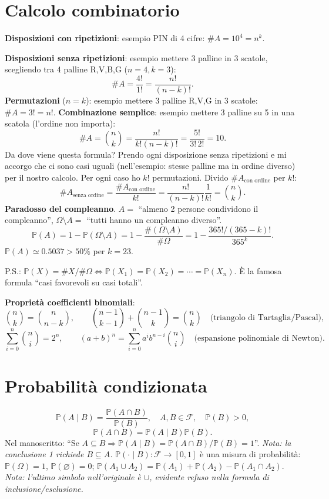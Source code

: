 \documentclass[11pt,a4paper]{article}
\newcommand{\pagina}[1]{\clearpage}
\begin{document}
\section*{Calcolo combinatorio}
\textbf{Disposizioni con ripetizioni}: esempio PIN di 4 cifre: $\#A=10^4=\boxed{n^k}$.

\textbf{Disposizioni senza ripetizioni}: esempio mettere 3 palline in 3 scatole, scegliendo tra 4 palline R,V,B,G ($n=4,k=3$):
\[\#A=\frac{4!}{1!}=\boxed{\frac{n!}{(n-k)!}}.\]
\textbf{Permutazioni} ($n=k$): esempio mettere 3 palline R,V,G in 3 scatole: $\#A=3!=\boxed{n!}$.
\pagina{14}\textbf{Combinazione semplice}: esempio mettere 3 palline su 5 in una scatola (l'ordine non importa):
\[\#A=\boxed{\binom nk}=\frac{n!}{k!(n-k)!}=\frac{5!}{3!\,2!}=10.\]
Da dove viene questa formula? Prendo ogni disposizione senza ripetizioni e mi accorgo che ci sono casi uguali (nell'esempio: stesse palline ma in ordine diverso) per il nostro calcolo. Per ogni caso ho $k!$ permutazioni. Divido $\#A_{\text{con ordine}}$ per $k!$:
\[\#A_{\text{senza ordine}}=\frac{\#A_{\text{con ordine}}}{k!}=\frac{n!}{(n-k)!}\frac1{k!}=\binom nk.\]
\textbf{Paradosso del compleanno}. $A=$ ``almeno 2 persone condividono il compleanno'', $\Omega\setminus A=$ ``tutti hanno un compleanno diverso''.
\[\mathbb P(A)=1-\mathbb P(\Omega\setminus A)=1-\frac{\#(\Omega\setminus A)}{\#\Omega}=1-\frac{365!/(365-k)!}{365^k}.\]
$\mathbb P(A)\simeq0.5037>50\%$ per $k=23$.

P.S.: $\mathbb P(X)=\#X/\#\Omega\Longleftrightarrow\mathbb P(X_1)=\mathbb P(X_2)=\cdots=\mathbb P(X_n)$. È la famosa formula ``casi favorevoli su casi totali''.

\textbf{Proprietà coefficienti binomiali}:
\[\binom nk=\binom n{n-k},\qquad\binom{n-1}{k-1}+\binom{n-1}k=\binom nk\quad\text{(triangolo di Tartaglia/Pascal)},\]
\[\sum_{i=0}^n\binom ni=2^n,\qquad(a+b)^n=\sum_{i=0}^n a^i b^{n-i}\binom ni\quad\text{(espansione polinomiale di Newton)}.\]
\pagina{15}\section*{Probabilità condizionata}
\[\boxed{\mathbb P(A\mid B)=\frac{\mathbb P(A\cap B)}{\mathbb P(B)}},\quad A,B\in\mathcal F,\quad\mathbb P(B)>0,\]
\[\mathbb P(A\cap B)=\mathbb P(A\mid B)\mathbb P(B).\]
Nel manoscritto: ``Se $A\subseteq B\Rightarrow\mathbb P(A\mid B)=\mathbb P(A\cap B)/\mathbb P(B)=1$''. \emph{Nota: la conclusione 1 richiede $B\subseteq A$.}
$\mathbb P(\cdot\mid B):\mathcal F\to[0,1]$ è una misura di probabilità: $\mathbb P(\Omega)=1$, $\mathbb P(\varnothing)=0$; $\mathbb P(A_1\cup A_2)=\mathbb P(A_1)+\mathbb P(A_2)-\mathbb P(A_1\cap A_2)$.
\emph{Nota: l'ultimo simbolo nell'originale è $\cup$, evidente refuso nella formula di inclusione/esclusione.}
\end{document}
